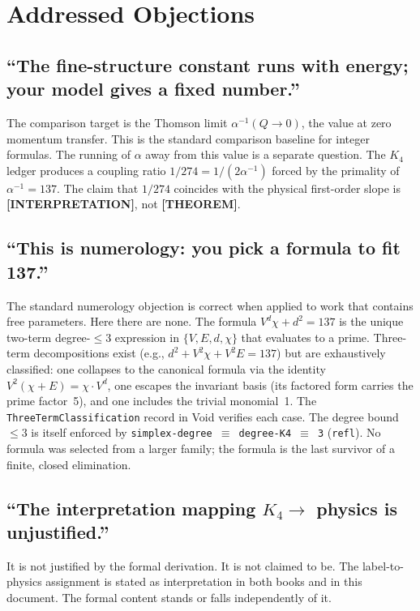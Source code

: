 \documentclass[11pt,a4paper]{article}
\newcommand{\THEOREM}{\textcolor{blue!70!black}{\textbf{[THEOREM]}}}
\newcommand{\INTERP}{\textcolor{orange!80!black}{\textbf{[INTERPRETATION]}}}
\theoremstyle{definition}
\begin{document}
\section{Addressed Objections}
\label{sec:objections}

\subsection*{``The fine-structure constant runs with energy; your model gives a fixed number.''}

The comparison target is the Thomson limit $\alpha^{-1}(Q \to 0)$, the value at
zero momentum transfer.  This is the standard comparison baseline for integer
formulas.  The running of $\alpha$ away from this value is a separate question.
The $K_4$ ledger produces a coupling ratio $1/274 = 1/(2\alpha^{-1})$ forced by
the primality of $\alpha^{-1} = 137$.
The claim that $1/274$ coincides with the physical first-order slope is
\INTERP, not \THEOREM.

\subsection*{``This is numerology: you pick a formula to fit 137.''}

The standard numerology objection is correct when applied to work that contains
free parameters.  Here there are none.  The formula $V^d\chi + d^2 = 137$
is the unique two-term degree-$\le 3$ expression in $\{V,E,d,\chi\}$ that
evaluates to a prime.  Three-term decompositions exist (e.g., $d^2 + V^2\chi
+ V^2 E = 137$) but are exhaustively classified: one collapses to the
canonical formula via the identity $V^2(\chi + E) = \chi \cdot V^d$, one
escapes the invariant basis (its factored form carries the prime factor~5),
and one includes the trivial monomial~1.  The \texttt{ThreeTermClassification}
record in Void verifies each case.  The degree bound $\le 3$ is itself
enforced by \texttt{simplex-degree $\equiv$ degree-K4 $\equiv$ 3} (\texttt{refl}).
No formula was selected from a larger family; the formula is the last survivor
of a finite, closed elimination.

\subsection*{``The interpretation mapping $K_4 \to$ physics is unjustified.''}

It is not justified by the formal derivation.  It is not claimed to be.
The label-to-physics assignment is stated as interpretation in both books and
in this document.  The formal content stands or falls independently of it.
\end{document}
